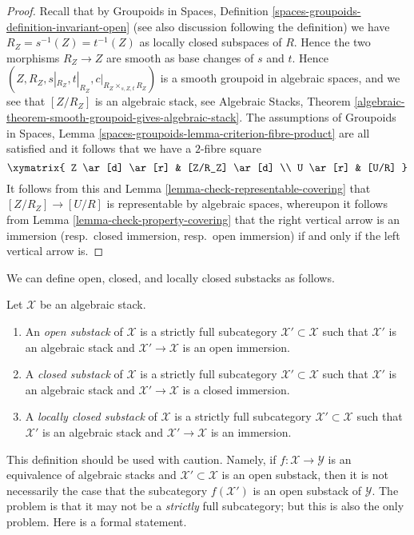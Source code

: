 \begin{proof}
Recall that by
Groupoids in Spaces,
Definition \ref{spaces-groupoids-definition-invariant-open}
(see also discussion following the definition)
we have $R_Z = s^{-1}(Z) = t^{-1}(Z)$ as locally closed subspaces
of $R$. Hence the two morphisms $R_Z \to Z$ are smooth as base changes
of $s$ and $t$. Hence
$(Z, R_Z, s|_{R_Z}, t|_{R_Z}, c|_{R_Z \times_{s, Z, t} R_Z})$ is
a smooth groupoid in algebraic spaces, and we see that
$[Z/R_Z]$ is an algebraic stack, see
Algebraic Stacks,
Theorem \ref{algebraic-theorem-smooth-groupoid-gives-algebraic-stack}.
The assumptions of
Groupoids in Spaces,
Lemma \ref{spaces-groupoids-lemma-criterion-fibre-product}
are all satisfied and it follows that we have a $2$-fibre square
$$
\xymatrix{
Z \ar[d] \ar[r] & [Z/R_Z] \ar[d] \\
U \ar[r] & [U/R]
}
$$
It follows from this and
Lemma \ref{lemma-check-representable-covering}
that $[Z/R_Z] \to [U/R]$ is representable by algebraic spaces,
whereupon it follows from
Lemma \ref{lemma-check-property-covering}
that the right vertical arrow is an immersion (resp.\ closed immersion,
resp.\ open immersion) if and only if the left vertical arrow is.
\end{proof}

\noindent
We can define open, closed, and locally closed substacks as follows.

\begin{definition}
\label{definition-substacks}
Let $\mathcal{X}$ be an algebraic stack.
\begin{enumerate}
\item An {\it open substack} of $\mathcal{X}$ is a strictly full subcategory
$\mathcal{X}' \subset \mathcal{X}$ such that $\mathcal{X}'$ is an algebraic
stack and $\mathcal{X}' \to \mathcal{X}$ is an open immersion.
\item A {\it closed substack} of $\mathcal{X}$ is a strictly full subcategory
$\mathcal{X}' \subset \mathcal{X}$ such that $\mathcal{X}'$ is an algebraic
stack and $\mathcal{X}' \to \mathcal{X}$ is a closed immersion.
\item A {\it locally closed substack} of $\mathcal{X}$ is a strictly full
subcategory $\mathcal{X}' \subset \mathcal{X}$ such that $\mathcal{X}'$
is an algebraic stack and $\mathcal{X}' \to \mathcal{X}$ is an immersion.
\end{enumerate}
\end{definition}

\noindent
This definition should be used with caution. Namely, if
$f : \mathcal{X} \to \mathcal{Y}$ is an equivalence of algebraic stacks
and $\mathcal{X}' \subset \mathcal{X}$ is an open substack, then it
is not necessarily the case that the subcategory $f(\mathcal{X}')$
is an open substack of $\mathcal{Y}$. The problem is that it may not
be a {\it strictly} full subcategory; but this is also the only problem.
Here is a formal statement.

